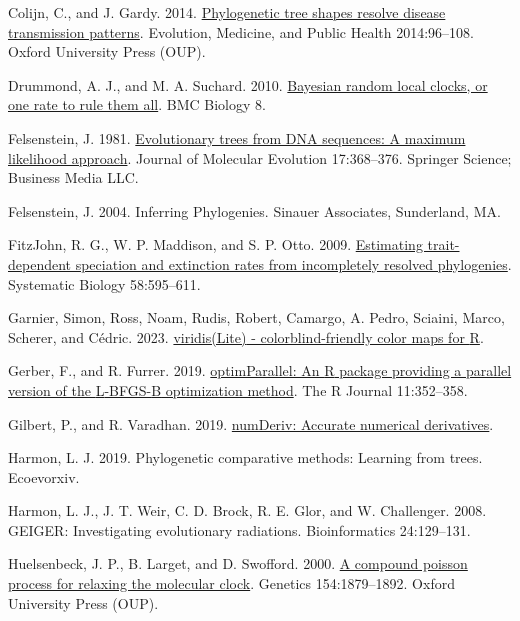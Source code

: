 \documentclass[fleqn,10pt,lineno]{wlpeerj} %
\newlength{\cslhangindent}
\newenvironment{CSLReferences}[2] %
 {\begin{list}{}{%
  \setlength{\itemindent}{0pt}
  \setlength{\leftmargin}{0pt}
  \setlength{\parsep}{0pt}
  \ifodd #1
   \setlength{\leftmargin}{\cslhangindent}
   \setlength{\itemindent}{-1\cslhangindent}
  \fi
  \setlength{\itemsep}{#2\baselineskip}}}
 {\end{list}}
\begin{document}
\begin{CSLReferences}{1}{0}
Colijn, C., and J. Gardy. 2014. \href{https://doi.org/10.1093/emph/eou018}{Phylogenetic tree shapes resolve disease transmission patterns}. Evolution, Medicine, and Public Health 2014:96--108. Oxford University Press (OUP).

Drummond, A. J., and M. A. Suchard. 2010. \href{https://doi.org/10.1186/1741-7007-8-114}{Bayesian random local clocks, or one rate to rule them all}. {BMC} Biology 8.

Felsenstein, J. 1981. \href{https://doi.org/10.1007/bf01734359}{Evolutionary trees from DNA sequences: A maximum likelihood approach}. Journal of Molecular Evolution 17:368--376. Springer Science; Business Media LLC.

Felsenstein, J. 2004. {Inferring Phylogenies}. {Sinauer Associates}, Sunderland, MA.

FitzJohn, R. G., W. P. Maddison, and S. P. Otto. 2009. \href{https://doi.org/10.1093/sysbio/syp067}{Estimating trait-dependent speciation and extinction rates from incompletely resolved phylogenies}. Systematic Biology 58:595--611.

Garnier, Simon, Ross, Noam, Rudis, Robert, Camargo, A. Pedro, Sciaini, Marco, Scherer, and Cédric. 2023. \href{https://doi.org/10.5281/zenodo.4678327}{{viridis(Lite)} - colorblind-friendly color maps for {R}}.

Gerber, F., and R. Furrer. 2019. \href{https://doi.org/10.32614/RJ-2019-030}{optimParallel: An {R} package providing a parallel version of the {L}-BFGS-{B} optimization method}. The R Journal 11:352--358.

Gilbert, P., and R. Varadhan. 2019. \href{https://CRAN.R-project.org/package=numDeriv}{numDeriv: Accurate numerical derivatives}.

Harmon, L. J. 2019. Phylogenetic comparative methods: Learning from trees. Ecoevorxiv.

Harmon, L. J., J. T. Weir, C. D. Brock, R. E. Glor, and W. Challenger. 2008. {GEIGER}: Investigating evolutionary radiations. Bioinformatics 24:129--131.

Huelsenbeck, J. P., B. Larget, and D. Swofford. 2000. \href{https://doi.org/10.1093/genetics/154.4.1879}{A compound poisson process for relaxing the molecular clock}. Genetics 154:1879--1892. Oxford University Press (OUP).


\end{CSLReferences}
\end{document}
